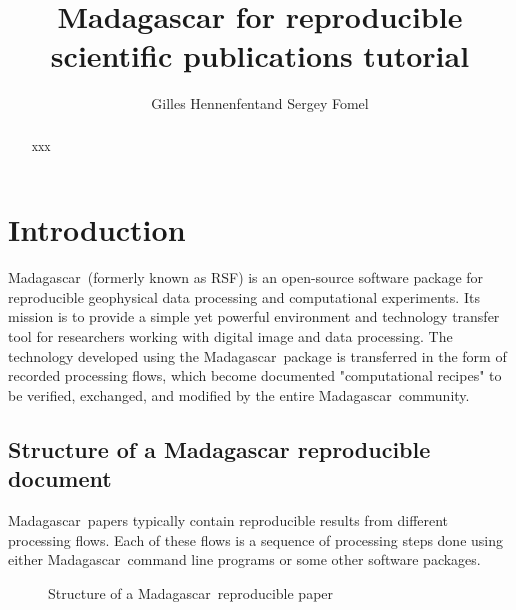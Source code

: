\author{Gilles Hennenfent\/\footnotemark[1] and Sergey Fomel\/\footnotemark[2]}
\title{Madagascar for reproducible scientific publications tutorial}


\newcommand{\rsf}{\textsf{Madagascar}\ }



\maketitle

\begin{abstract}
   xxx
\end{abstract}

\section{Introduction}

\rsf (formerly known as \textsf{RSF}) is an open-source software
package for reproducible geophysical data processing and computational
experiments. Its mission is to provide a simple yet powerful
environment and technology transfer tool for researchers working with
digital image and data processing. The technology developed using the
\rsf package is transferred in the form of recorded processing flows,
which become documented "computational recipes" to be verified,
exchanged, and modified by the entire \rsf community.

\subsection{Structure of a Madagascar reproducible document}

\rsf papers typically contain reproducible results from different
processing flows. Each of these flows is a sequence of processing
steps done using either \rsf command line programs or some other
software packages.

\begin{figure}[h]
\begin{center}

\end{center}
\caption{Structure of a \rsf reproducible paper}\label{fig:struct}
\end{figure}

